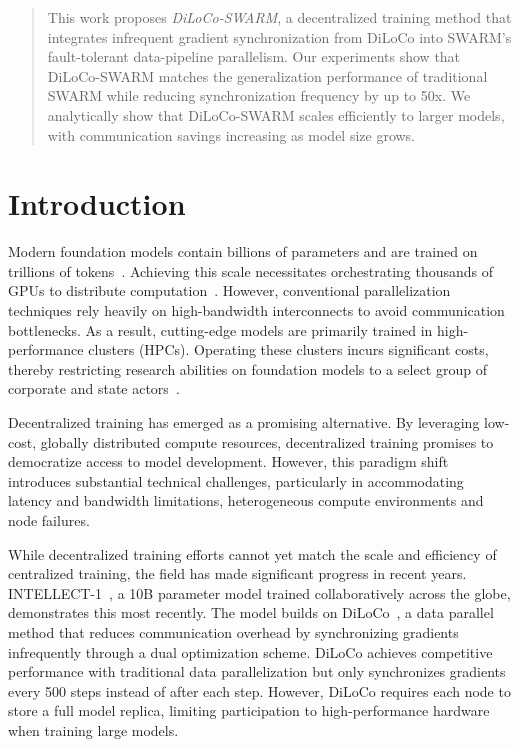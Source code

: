 \documentclass{article}
\begin{document}
\begin{abstract}
  This work proposes \textit{DiLoCo-SWARM}, a decentralized training method that integrates infrequent gradient synchronization from DiLoCo into SWARM's fault-tolerant data-pipeline parallelism. Our experiments show that DiLoCo-SWARM matches the generalization performance of traditional SWARM while reducing synchronization frequency by up to 50x. We analytically show that DiLoCo-SWARM scales efficiently to larger models, with communication savings increasing as model size grows.
\end{abstract}

\section{Introduction}

Modern foundation models contain billions of parameters and are trained on trillions of tokens~\cite{chowdhery2022palm,brown2023gpt3,dubey2024llama3,google2024gemini}. Achieving this scale necessitates orchestrating thousands of GPUs to distribute computation~\cite{dubey2024llama3,deepseekai2024}. However, conventional parallelization techniques rely heavily on high-bandwidth interconnects to avoid communication bottlenecks. As a result, cutting-edge models are primarily trained in high-performance clusters (HPCs). Operating these clusters incurs significant costs, thereby restricting research abilities on foundation models to a select group of corporate and state actors~\cite{jaghouar2024intellect1}.

Decentralized training has emerged as a promising alternative. By leveraging low-cost, globally distributed compute resources, decentralized training promises to democratize access to model development. However, this paradigm shift introduces substantial technical challenges, particularly in accommodating latency and bandwidth limitations, heterogeneous compute environments and node failures.

While decentralized training efforts cannot yet match the scale and efficiency of centralized training, the field has made significant progress in recent years. INTELLECT-1~\cite{jaghouar2024intellect1}, a 10B parameter model trained collaboratively across the globe, demonstrates this most recently. The model builds on DiLoCo~\cite{douillard2023diloco}, a data parallel method that reduces communication overhead by synchronizing gradients infrequently through a dual optimization scheme. DiLoCo achieves competitive performance with traditional data parallelization but only synchronizes gradients every 500 steps instead of after each step. However, DiLoCo requires each node to store a full model replica, limiting participation to high-performance hardware when training large models.
\end{document}
